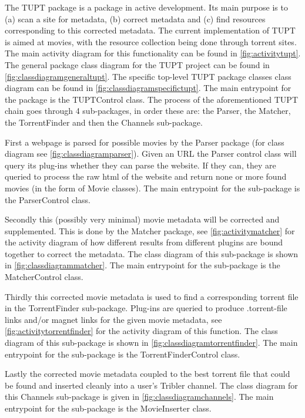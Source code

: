 The TUPT package is a package in active development.
Its main purpose is to (a) scan a site for metadata, (b) correct metadata and (c) find resources corresponding
to this corrected metadata.
The current implementation of TUPT is aimed at movies, with the resource collection being done
through torrent sites.
The main activity diagram for this functionality can be found in \autoref{fig:activitytupt}.
The general package class diagram for the TUPT project can be found in \autoref{fig:classdiagramgeneraltupt}.
The specific top-level TUPT package classes class diagram can be found in \autoref{fig:classdiagramspecifictupt}.
The main entrypoint for the package is the TUPTControl class.
The process of the aforementioned TUPT chain goes through 4 sub-packages, in order these are:
the Parser, the Matcher, the TorrentFinder and then the Channels sub-package.

First a webpage is parsed for possible movies by the Parser package (for class diagram see \autoref{fig:classdiagramparser}).
Given an URL the Parser control class will query its plug-ins whether they can parse the website.
If they can, they are queried to process the raw html of the website and return none or more 
found movies (in the form of Movie classes).
The main entrypoint for the sub-package is the ParserControl class.

Secondly this (possibly very minimal) movie metadata will be corrected and supplemented.
This is done by the Matcher package, see \autoref{fig:activitymatcher} for the activity diagram
of how different results from different plugins are bound together to correct the metadata.
The class diagram of this sub-package is shown in \autoref{fig:classdiagrammatcher}.
The main entrypoint for the sub-package is the MatcherControl class.

Thirdly this corrected movie metadata is used to find a corresponding torrent file in the TorrentFinder sub-package.
Plug-ins are queried to produce .torrent-file links and/or magnet links for the given movie metadata,
see \autoref{fig:activitytorrentfinder} for the activity diagram of this function.
The class diagram of this sub-package is shown in \autoref{fig:classdiagramtorrentfinder}.
The main entrypoint for the sub-package is the TorrentFinderControl class.

Lastly the corrected movie metadata coupled to the best torrent file that could be found
and inserted cleanly into a user's Tribler channel.
The class diagram for this Channels sub-package is given in \autoref{fig:classdiagramchannels}.
The main entrypoint for the sub-package is the MovieInserter class.

